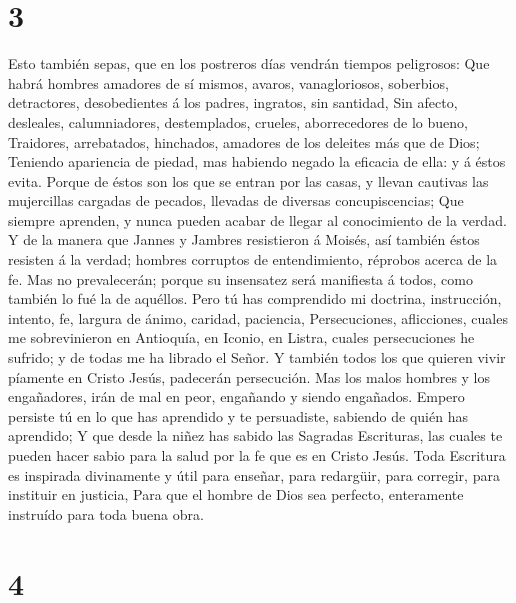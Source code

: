 \hypertarget{section-2}{%
\section{3}\label{section-2}}

 Esto también sepas, que en los postreros días vendrán
tiempos peligrosos:  Que habrá hombres amadores de sí
mismos, avaros, vanagloriosos, soberbios, detractores, desobedientes á
los padres, ingratos, sin santidad,  Sin afecto,
desleales, calumniadores, destemplados, crueles, aborrecedores de lo
bueno,  Traidores, arrebatados, hinchados, amadores de los
deleites más que de Dios;  Teniendo apariencia de piedad,
mas habiendo negado la eficacia de ella: y á éstos evita. 
Porque de éstos son los que se entran por las casas, y llevan cautivas
las mujercillas cargadas de pecados, llevadas de diversas
concupiscencias;  Que siempre aprenden, y nunca pueden
acabar de llegar al conocimiento de la verdad.  Y de la
manera que Jannes y Jambres resistieron á Moisés, así también éstos
resisten á la verdad; hombres corruptos de entendimiento, réprobos
acerca de la fe.  Mas no prevalecerán; porque su
insensatez será manifiesta á todos, como también lo fué la de aquéllos.
 Pero tú has comprendido mi doctrina, instrucción,
intento, fe, largura de ánimo, caridad, paciencia, 
Persecuciones, aflicciones, cuales me sobrevinieron en Antioquía, en
Iconio, en Listra, cuales persecuciones he sufrido; y de todas me ha
librado el Señor.  Y también todos los que quieren vivir
píamente en Cristo Jesús, padecerán persecución.  Mas los
malos hombres y los engañadores, irán de mal en peor, engañando y siendo
engañados.  Empero persiste tú en lo que has aprendido y
te persuadiste, sabiendo de quién has aprendido;  Y que
desde la niñez has sabido las Sagradas Escrituras, las cuales te pueden
hacer sabio para la salud por la fe que es en Cristo Jesús.
 Toda Escritura es inspirada divinamente y útil para
enseñar, para redargüir, para corregir, para instituir en justicia,
 Para que el hombre de Dios sea perfecto, enteramente
instruído para toda buena obra.

\hypertarget{section-3}{%
\section{4}\label{section-3}}

